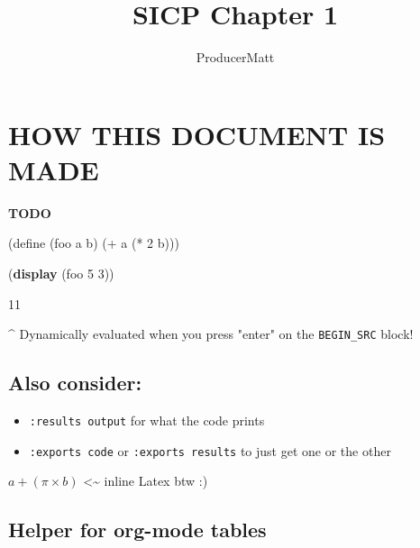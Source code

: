 \documentclass[
]{article}
\title{SICP Chapter 1}
\author{ProducerMatt}
\date{}
\newenvironment{Shaded}{}{}
\newcommand{\DecValTok}[1]{\textcolor[rgb]{0.25,0.63,0.44}{#1}}
\newcommand{\ExtensionTok}[1]{#1}
\newcommand{\FunctionTok}[1]{\textcolor[rgb]{0.02,0.16,0.49}{#1}}
\newcommand{\KeywordTok}[1]{\textcolor[rgb]{0.00,0.44,0.13}{\textbf{#1}}}
\newcommand{\NormalTok}[1]{#1}
\newcommand{\OperatorTok}[1]{\textcolor[rgb]{0.40,0.40,0.40}{#1}}
\providecommand{\tightlist}{%
  \setlength{\itemsep}{0pt}\setlength{\parskip}{0pt}}
\begin{document}
\maketitle

\hypertarget{how-this-document-is-made}{%
\section{HOW THIS DOCUMENT IS MADE}\label{how-this-document-is-made}}

\textbf{\textbf{TODO}}

\hypertarget{testing}{%
\label{testing}}%
\begin{Shaded}
\begin{Highlighting}[numbers=left,,]
\NormalTok{(}\ExtensionTok{define}\FunctionTok{ }\NormalTok{(foo a b)}
\NormalTok{  (}\OperatorTok{+}\NormalTok{ a (}\OperatorTok{*} \DecValTok{2}\NormalTok{ b)))}

\NormalTok{(}\KeywordTok{display}
\NormalTok{ (foo }\DecValTok{5} \DecValTok{3}\NormalTok{))}
\end{Highlighting}
\end{Shaded}

\begin{Shaded}
\begin{Highlighting}[]
\DecValTok{11}
\end{Highlighting}
\end{Shaded}

\^{} Dynamically evaluated when you press "enter" on the
\texttt{BEGIN\_SRC} block!

\hypertarget{also-consider}{%
\subsection{Also consider:}\label{also-consider}}

\begin{itemize}
\tightlist
\item
  \texttt{:results\ output} for what the code prints
\item
  \texttt{:exports\ code} or \texttt{:exports\ results} to just get one
  or the other
\end{itemize}

\(a + (\pi \times b)\) \textless\textasciitilde{} inline Latex btw :)

\hypertarget{helper-for-org-mode-tables}{%
\subsection{Helper for org-mode
tables}\label{helper-for-org-mode-tables}}
\end{document}
